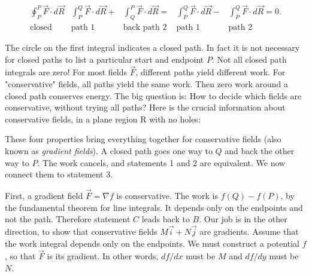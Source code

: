 \begin{align*}
\oint_P^P \vec F \cdot d\vec R &\int_P^Q\vec F \cdot d\vec R + &\int_Q^P\vec F \cdot d\vec R=&\int_P^Q\vec F \cdot d\vec R - &\int_P^Q\vec F \cdot d\vec R=0. \\
\text{closed}&\text{path 1}&\text{back path 2}&\text{path 1}&\text{path 2}
\end{align*}

The circle on the first integral indicates a closed path. In fact it is not necessary for closed paths to list a particular start and endpoint $P$.
Not all closed path integrals are zero! For most fields $\vec F$, different paths yield
different work. For "conservative" fields, all paths yield the same work. Then zero 
work around a closed path conserves energy. The big question is: How to decide
which fields are conservative, without trying all paths? Here is the crucial information
about conservative fields, in a plane region R with no holes:

These four properties bring everything together for conservative fields (also known as \emph{gradient
fields}). A closed path goes one way to $Q$ and back the other way to $P$. The work
cancels, and statements 1 and 2 are equivalent. We now connect them to statement 3. 

First, a gradient field $\vec F = \nabla f$ is conservative. The work is $f(Q) - f(P)$, by the
fundamental theorem for line integrals. It depends only on the endpoints and not the
path. Therefore statement $C$ leads back to $B$.
Our job is in the other direction, to show that conservative fields $M\vec i + N\vec j$ are
gradients. Assume that the work integral depends only on the endpoints. We must
construct a potential $f$, so that $\vec F$ is its gradient. In other words, $df/dx$ must be $M$ and
$df/dy$ must be $N$.

